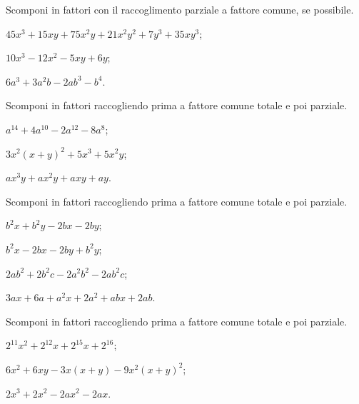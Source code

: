 \begin{esercizio}[\Ast]
\label{ese:13.29}
Scomponi in fattori con il raccoglimento parziale a fattore comune, se possibile.
\begin{enumeratea}
 \item $45x^{3}+15xy+75x^{2}y+21x^{2}y^{2}+7y^{3}+35xy^{3}$;
 \item $10x^3-12x^2-5xy+6y$;
 \item $6a^3+3a^2b-2ab^3-b^4$.
\end{enumeratea}
\end{esercizio}

\begin{esercizio}[\Ast]
\label{ese:13.30}
Scomponi in fattori raccogliendo prima a fattore comune totale e poi parziale.
\begin{multicols}{2}
 \begin{enumeratea}
 \item $a^{14}+4a^{10}-2a^{12}-8a^{8}$;
 \item $3x^{2}(x+y)^{2}+5x^{3}+5x^{2}y$;
 \item $ax^{3}y+ax^{2}y+axy+ay$.
\end{enumeratea}
\end{multicols}
\end{esercizio}

\begin{esercizio}
\label{ese:13.31}
Scomponi in fattori raccogliendo prima a fattore comune totale e poi parziale.
\begin{multicols}{2}
\begin{enumeratea}
 \item $b^{2}x+b^{2}y-2bx-2by$;
 \item $b^{2}x-2bx-2by+b^{2}y$;
 \item $2ab^{2}+2b^{2}c-2a^{2}b^{2}-2ab^{2}c$;
 \item $3ax+6a+a^{2}x+2a^{2}+abx+2ab$.
\end{enumeratea}
\end{multicols}
\end{esercizio}

\begin{esercizio}[\Ast]
\label{ese:13.32}
Scomponi in fattori raccogliendo prima a fattore comune totale e poi parziale.
\begin{enumeratea}
 \item $2^{11}x^{2}+2^{12}x+2^{15}x+2^{16}$;
 \item $6x^{2}+6xy-3x(x+y)-9x^{2}(x+y)^{2}$;
 \item $2x^{3}+2x^{2}-2ax^{2}-2ax$.

\end{enumeratea}
\end{esercizio}

